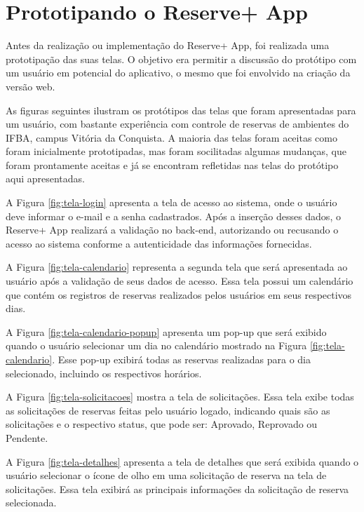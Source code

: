 \documentclass[12pt]{article}
\begin{document}
\section{Prototipando o Reserve+ App} \label{sec:prototype}

Antes da realização ou implementação do Reserve+ App, foi realizada uma prototipação das suas telas. O objetivo era permitir a discussão do protótipo com um usuário em potencial do aplicativo, o mesmo que foi envolvido na criação da versão web. 

As figuras seguintes ilustram os protótipos das telas que foram apresentadas para um usuário, com bastante experiência com controle de reservas de ambientes do IFBA, campus Vitória da Conquista. A maioria das telas foram aceitas como foram inicialmente prototipadas, mas foram socilitadas algumas mudanças, que foram prontamente aceitas e já se encontram refletidas nas telas do protótipo aqui apresentadas.

A Figura \ref{fig:tela-login} apresenta a tela de acesso ao sistema, onde o usuário deve informar o e-mail e a senha cadastrados. Após a inserção desses dados, o Reserve+ App realizará a validação no back-end, autorizando ou recusando o acesso ao sistema conforme a autenticidade das informações fornecidas.

A Figura \ref{fig:tela-calendario} representa a segunda tela que será apresentada ao usuário após a validação de seus dados de acesso. Essa tela possui um calendário que contém os registros de reservas realizados pelos usuários em seus respectivos dias.

A Figura \ref{fig:tela-calendario-popup} apresenta um pop-up que será exibido quando o usuário selecionar um dia no calendário mostrado na Figura \ref{fig:tela-calendario}. Esse pop-up exibirá todas as reservas realizadas para o dia selecionado, incluindo os respectivos horários.

A Figura \ref{fig:tela-solicitacoes} mostra a tela de solicitações. Essa tela exibe todas as solicitações de reservas feitas pelo usuário logado, indicando quais são as solicitações e o respectivo status, que pode ser: Aprovado, Reprovado ou Pendente.

A Figura \ref{fig:tela-detalhes} apresenta a tela de detalhes que será exibida quando o usuário selecionar o ícone de olho em uma solicitação de reserva na tela de solicitações. Essa tela exibirá as principais informações da solicitação de reserva selecionada.
\end{document}
